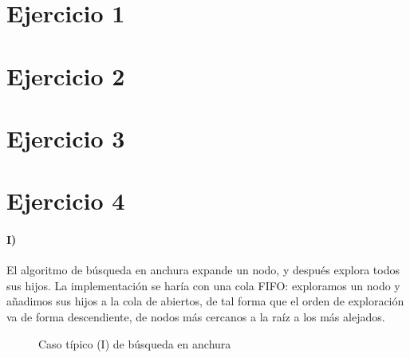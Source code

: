 \documentclass{aitemplate}
\begin{document}

\section*{Ejercicio 1}

%
\newpage

%
%
%
\newpage

\section*{Ejercicio 2}

%
\newpage

\newpage

\newpage

\section*{Ejercicio 3}

\newpage

\newpage

\newpage

\newpage

\newpage

\newpage
%

\section*{Ejercicio 4}

\paragraph*{I)} El algoritmo de búsqueda en anchura expande un nodo, y después explora todos sus hijos. La implementación se haría con una cola FIFO: exploramos un nodo y añadimos sus hijos a la cola de abiertos, de tal forma que el orden de exploración va de forma descendiente, de nodos más cercanos a la raíz a los más alejados.

\begin{figure}[hbtp]
\centering
{}
\caption{Caso típico (I) de búsqueda en anchura}
\end{figure}
\end{document}
